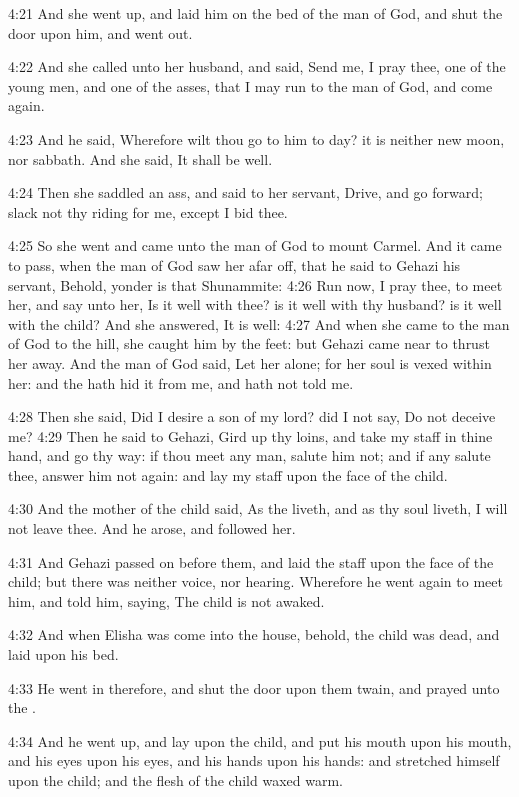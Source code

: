 4:21 And she went up, and laid him on the bed of the man of God, and shut the door upon him, and went out.

4:22 And she called unto her husband, and said, Send me, I pray thee, one of the young men, and one of the asses, that I may run to the man of God, and come again.

4:23 And he said, Wherefore wilt thou go to him to day? it is neither new moon, nor sabbath. And she said, It shall be well.

4:24 Then she saddled an ass, and said to her servant, Drive, and go forward; slack not thy riding for me, except I bid thee.

4:25 So she went and came unto the man of God to mount Carmel. And it came to pass, when the man of God saw her afar off, that he said to Gehazi his servant, Behold, yonder is that Shunammite: 4:26 Run now, I pray thee, to meet her, and say unto her, Is it well with thee? is it well with thy husband? is it well with the child? And she answered, It is well: 4:27 And when she came to the man of God to the hill, she caught him by the feet: but Gehazi came near to thrust her away. And the man of God said, Let her alone; for her soul is vexed within her: and the \LORD hath hid it from me, and hath not told me.

4:28 Then she said, Did I desire a son of my lord? did I not say, Do not deceive me?  4:29 Then he said to Gehazi, Gird up thy loins, and take my staff in thine hand, and go thy way: if thou meet any man, salute him not; and if any salute thee, answer him not again: and lay my staff upon the face of the child.

4:30 And the mother of the child said, As the \LORD liveth, and as thy soul liveth, I will not leave thee. And he arose, and followed her.

4:31 And Gehazi passed on before them, and laid the staff upon the face of the child; but there was neither voice, nor hearing. Wherefore he went again to meet him, and told him, saying, The child is not awaked.

4:32 And when Elisha was come into the house, behold, the child was dead, and laid upon his bed.

4:33 He went in therefore, and shut the door upon them twain, and prayed unto the \LORD.

4:34 And he went up, and lay upon the child, and put his mouth upon his mouth, and his eyes upon his eyes, and his hands upon his hands: and stretched himself upon the child; and the flesh of the child waxed warm.


